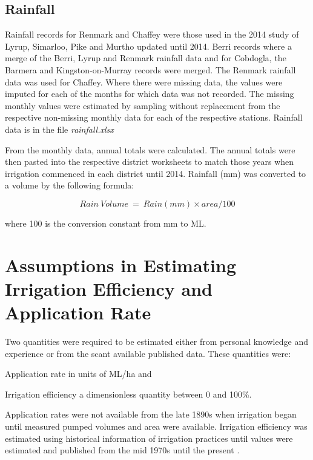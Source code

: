 \documentclass[a4paper, titlepage, 12pt]{article}\usepackage[]{graphicx}\usepackage[]{color}
\begin{document}
\begin{sffamily}
\subsection{Rainfall} Rainfall records for Renmark and Chaffey were those used in the 2014 study of Lyrup, Simarloo, Pike and Murtho \citep{Meissner2014} updated until 2014. Berri records where a merge of the Berri, Lyrup and Renmark rainfall data and for Cobdogla, the Barmera and Kingston-on-Murray records were merged. The Renmark rainfall data was used for Chaffey. Where there were missing data, the values were imputed for each of the months for which data was not recorded. The missing monthly values were estimated by sampling without replacement from the respective non-missing monthly data for each of the respective stations. Rainfall data is in the file \textit{rainfall.xlsx}

From the monthly data, annual totals were calculated.  The annual totals were then pasted into the respective district worksheets to match those years when irrigation commenced in each district until 2014. Rainfall (mm) was converted to a volume by the following formula:

\begin{equation} \label{eqn03} 
  Rain\ Volume\ =\ Rain (mm) \times area / 100
\end{equation}

\noindent where 100 is the conversion constant from mm to ML.

\section{Assumptions in Estimating Irrigation Efficiency and Application Rate}
Two quantities were required to be estimated either from personal knowledge and experience or from the scant available published data.  These quantities were: \begin{inparaenum}[(i)] \item Application rate in units of ML/ha and \item Irrigation efficiency a dimensionless quantity between 0 and 100\%. \end{inparaenum} Application rates were not available from the late 1890s when irrigation began until measured pumped volumes and area were available.  Irrigation efficiency was estimated using historical information of irrigation practices until values were estimated and published from the mid 1970s until the present \citep{Adams2009}.


\end{sffamily}
\end{document}
